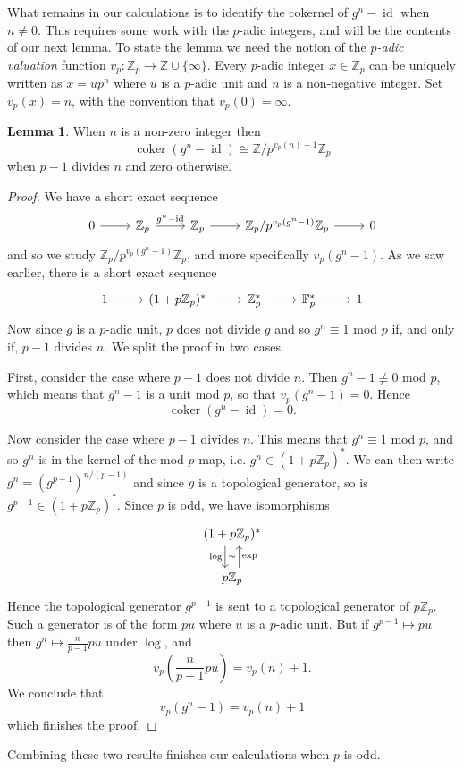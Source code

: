 \documentclass[a4paper]{article} %
\theoremstyle{definition}
\newtheorem{lemma}[theorem]{Lemma}
\newcommand{\Z}{\mathbb{Z}}
\newcommand{\F}{\mathbb{F}}
\DeclareMathOperator{\id}{id}           %
\DeclareMathOperator{\coker}{coker}     %
\begin{document}
What remains in our calculations is to identify the cokernel of $g^n-\id$ when $n \neq 0$. This requires some work with the $p$-adic integers, and will be the contents of our next lemma. To state the lemma we need the notion of the \textit{$p$-adic valuation} function $v_p \colon \Z_p \to \Z \cup \{\infty\}$. Every $p$-adic integer $x \in \Z_p$ can be uniquely written as $x = up^n$ where $u$ is a $p$-adic unit and $n$ is a non-negative integer. Set $v_p(x) = n$, with the convention that $v_p(0) = \infty$.
\begin{lemma}
  When $n$ is a non-zero  integer then
  \[
    \coker(g^n - \id) \cong \Z/p^{v_p(n)+1}\Z_p
  \]
  when $p-1$ divides $n$ and zero otherwise.
\end{lemma}
\begin{proof}
We have a short exact sequence 
\[
\begin{tikzcd}
0 \rar & \Z_p \rar{g^n - \operatorname{id}} & \Z_p \rar{} & \Z_p/{p^{v_p(g^n-1)}\Z_p} \rar & 0
\end{tikzcd}
\]
and so we study $\Z_p/{p^{v_p(g^n-1)}\Z_p}$, and more specifically $v_p(g^n-1)$. As we saw earlier, there is a short exact sequence
\[
\begin{tikzcd}
1 \rar & (1+p\Z_p)^* \rar{} & \Z_p^* \rar{} & \F_p^* \rar & 1
\end{tikzcd}
\]
Now since $g$ is a $p$-adic unit, $p$ does not divide $g$ and so $g^n \equiv 1$ mod $p$ if, and only if, $p-1$ divides $n$. We split the proof in two cases.

First, consider the case where $p-1$ does not divide $n$. Then $g^n -1 \not\equiv 0$ mod $p$, which means that $g^n -1$ is a unit mod $p$, so that $v_p(g^n - 1) = 0$. Hence
\[
\coker ( g^n - \id ) = 0.
\]

Now consider the case where $p-1$ divides $n$. This means that $g^n \equiv 1$ mod $p$, and so $g^n$ is in the kernel of the mod $p$ map, i.e. $g^n \in (1 + p\Z_p)^*$. We can then write $g^n = (g^{p-1})^{n/(p-1)}$ and since $g$ is a topological generator, so is $g^{p-1} \in (1 + p\Z_p)^*$. Since $p$ is odd, we have isomorphisms
\[
\begin{tikzcd}
  (1+ p\Z_p)^* \arrow[d, "\log"', "\sim", shift right=1.3ex] \\
  p\Z_p \arrow[u, "\exp"', shift right = 1.3ex]{exp}
\end{tikzcd}
\]
Hence the topological generator $g^{p-1}$ is sent to a topological generator of $p\Z_p$. Such a generator is of the form $pu$ where $u$ is a $p$-adic unit. But if $g^{p-1} \mapsto pu$ then $g^n \mapsto \frac{n}{p-1}pu$ under $\log$, and $$v_p\left(\frac{n}{p-1}pu\right) = v_p(n)+1.$$ We conclude that
\[
v_p(g^n - 1 ) = v_p(n) + 1
\]
which finishes the proof.
\end{proof}
Combining these two results finishes our calculations when $p$ is odd.
\end{document}
